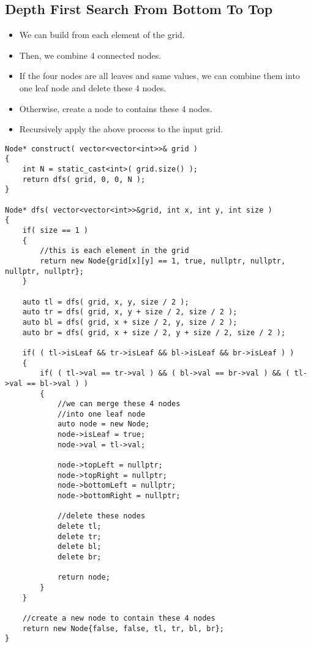 \subsection{Depth First Search From Bottom To Top}
\begin{itemize}
\item We can build from each element of the grid.
\item Then, we combine 4 connected nodes.
\item If the four nodes are all leaves and same values, we can combine them into one leaf node and delete these 4 nodes.
\item Otherwise, create a node to contains these 4 nodes.
\item Recursively apply the above process to the input grid.
\end{itemize}

\begin{lstlisting}[style=customc, caption={Build From Bottom To Top}]
Node* construct( vector<vector<int>>& grid )
{
    int N = static_cast<int>( grid.size() );
    return dfs( grid, 0, 0, N );
}

Node* dfs( vector<vector<int>>&grid, int x, int y, int size )
{
    if( size == 1 )
    {
        //this is each element in the grid
        return new Node{grid[x][y] == 1, true, nullptr, nullptr, nullptr, nullptr};
    }

    auto tl = dfs( grid, x, y, size / 2 );
    auto tr = dfs( grid, x, y + size / 2, size / 2 );
    auto bl = dfs( grid, x + size / 2, y, size / 2 );
    auto br = dfs( grid, x + size / 2, y + size / 2, size / 2 );

    if( ( tl->isLeaf && tr->isLeaf && bl->isLeaf && br->isLeaf ) )
    {
        if( ( tl->val == tr->val ) && ( bl->val == br->val ) && ( tl->val == bl->val ) )
        {
            //we can merge these 4 nodes
            //into one leaf node
            auto node = new Node;
            node->isLeaf = true;
            node->val = tl->val;

            node->topLeft = nullptr;
            node->topRight = nullptr;
            node->bottomLeft = nullptr;
            node->bottomRight = nullptr;

            //delete these nodes
            delete tl;
            delete tr;
            delete bl;
            delete br;

            return node;
        }
    }

    //create a new node to contain these 4 nodes
    return new Node{false, false, tl, tr, bl, br};
}
\end{lstlisting}